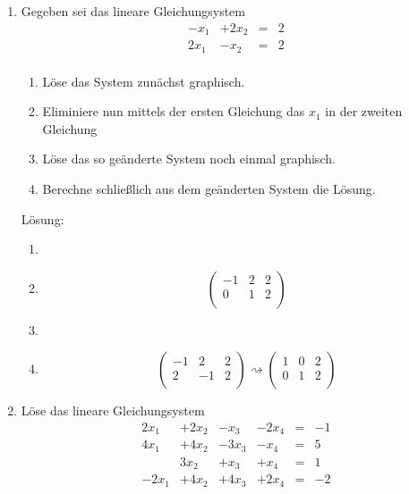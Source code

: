 \documentclass[main.tex]{subfiles}
\begin{document}
\begin{enumerate}
	\item Gegeben sei das lineare Gleichungsystem
	      \[ \begin{array}{cccc}
			      -x_1 & +2 x_2 & = & 2 \\
			      2x_1 & -x_2   & = & 2 \\
		      \end{array} \]
	      \begin{enumerate}
		      \item Löse das System zunächst graphisch.
		      \item Eliminiere nun mittels der ersten Gleichung das \( x_1 \)
		            in der zweiten Gleichung
		      \item Löse das so geänderte System noch einmal graphisch.
		      \item Berechne schließlich aus dem geänderten System die Lösung.
	      \end{enumerate}

	      Lösung:
	      \begin{enumerate}
		      \item
		      \item \[ \begin{pmatrix}
				            -1 & 2 & 2 \\
				            0  & 1 & 2 \\
			            \end{pmatrix} \]
		      \item
		      \item  \[
			            \begin{pmatrix}
				            -1 & 2  & 2 \\
				            2  & -1 & 2 \\
			            \end{pmatrix}
			            \rightsquigarrow
			            \begin{pmatrix}
				            1 & 0 & 2 \\
				            0 & 1 & 2 \\
			            \end{pmatrix}
		            \]
	      \end{enumerate}
	\item Löse das lineare Gleichungsystem
	      \[ \begin{array}{cccccc}
			      2x_1  & +2x_2 & -x_3  & -2x_4 & = & -1 \\
			      4x_1  & +4x_2 & -3x_3 & -x_4  & = & 5  \\
			            & 3x_2  & +x_3  & +x_4  & = & 1  \\
			      -2x_1 & +4x_2 & +4x_3 & +2x_4 & = & -2 \\
		      \end{array} \]


\end{enumerate}
\end{document}
